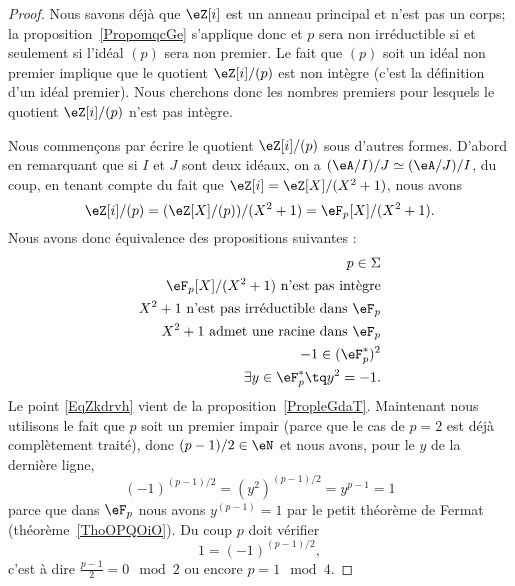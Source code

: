 \begin{proof}
    Nous savons déjà que \( \eZ[i]\) est un anneau principal et n'est pas un corps; la proposition~\ref{PropomqcGe} s'applique donc et \( p\) sera non irréductible si et seulement si l'idéal \( (p)\) sera non premier. Le fait que \( (p)\) soit un idéal non premier implique que le quotient \( \eZ[i]/(p)\) est non intègre (c'est la définition d'un idéal premier). Nous cherchons donc les nombres premiers pour lesquels le quotient \( \eZ[i]/(p)\) n'est pas intègre.

    Nous commençons par écrire le quotient \( \eZ[i]/(p)\) sous d'autres formes. D'abord en remarquant que si \( I\) et \( J\) sont deux idéaux, on a \( (\eA/I)/J\simeq (\eA/J)/I\), du coup, en tenant compte du fait que \( \eZ[i]=\eZ[X]/(X^2+1)\), nous avons
    \begin{equation}
        \eZ[i]/(p)=(\eZ[X]/(p))/(X^2+1)=\eF_p[X]/(X^2+1).
    \end{equation}
    Nous avons donc équivalence des propositions suivantes :
    \begin{subequations}
        \begin{align}
            p\in\Sigma\\
            \eF_p[X]/(X^2+1)\text{ n'est pas intègre}\\
            X^2+1\text{ n'est pas irréductible dans } \eF_p \label{EqZkdrvh}\\
             X^2+1\text{ admet une racine dans } \eF_p\\
            -1\in (\eF_p^*)^2\\
            \exists y\in \eF_p^*\tq y^2=-1.
        \end{align}
    \end{subequations}
    Le point \eqref{EqZkdrvh} vient de la proposition~\ref{PropleGdaT}. Maintenant nous utilisons le fait que \( p\) soit un premier impair (parce que le cas de \( p=2\) est déjà complètement traité), donc \( (p-1)/2\in \eN\) et nous avons, pour le \( y\) de la dernière ligne,
    \begin{equation}
        (-1)^{(p-1)/2}=(y^2)^{(p-1)/2}=y^{p-1}=1
    \end{equation}
    parce que dans \( \eF_p\) nous avons \( y^{(p-1)}=1\) par le petit théorème de Fermat (théorème~\ref{ThoOPQOiO}). Du coup \( p\) doit vérifier
    \begin{equation}
        1=(-1)^{(p-1)/2},
    \end{equation}
    c'est à dire \( \frac{ p-1 }{2}=0\mod 2\) ou encore \( p=1\mod 4\).
\end{proof}


